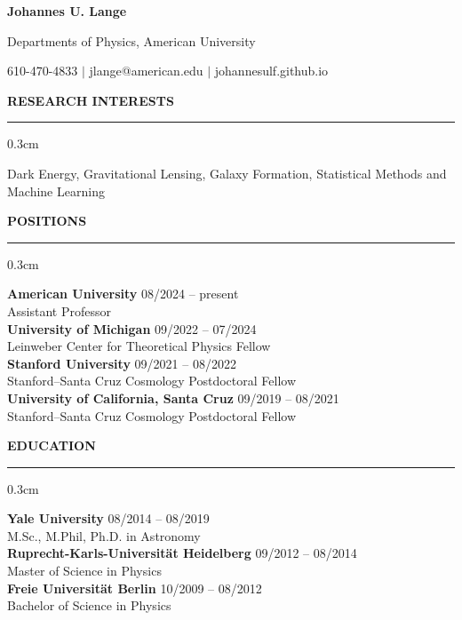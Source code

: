 \documentclass[12pt]{article}
\renewenvironment{section}[1]
  {
  \medskip
  {\color{aublue} \MakeUppercase{\bf #1}}
  \smallskip
  \hrule
  \medskip
  \begin{adjustwidth}{0.3cm}{}
  }
  {
  \end{adjustwidth}
  }
\newcommand{\entry}[3]{{\bf #1} \hfill {#2} \\ {#3}}
\begin{document}
\centerline{\color{aublue} \Huge \bf Johannes U. Lange}
\centerline{Departments of Physics, American University}
\centerline{610-470-4833 $\vert$ jlange@american.edu $\vert$ johannesulf.github.io}
\bigskip

\begin{section}{Research Interests}
  Dark Energy, Gravitational Lensing, Galaxy Formation, Statistical Methods and Machine Learning
\end{section}

\begin{section}{Positions}
  \entry{American University}{08/2024 -- present}{Assistant Professor} \medskip \\
  \entry{University of Michigan}{09/2022 -- 07/2024}{Leinweber Center for Theoretical Physics Fellow} \medskip \\
  \entry{Stanford University}{09/2021 -- 08/2022}{Stanford--Santa Cruz Cosmology Postdoctoral Fellow} \medskip \\
  \entry{University of California, Santa Cruz}{09/2019 -- 08/2021}{Stanford--Santa Cruz Cosmology Postdoctoral Fellow}
\end{section}

\begin{section}{Education}
  \entry{Yale University}{08/2014 -- 08/2019}{M.Sc., M.Phil, Ph.D. in Astronomy} \medskip \\
  \entry{Ruprecht-Karls-Universität Heidelberg}{09/2012 -- 08/2014}{Master of Science in Physics} \medskip \\
  \entry{Freie Universität Berlin}{10/2009 -- 08/2012}{Bachelor of Science in Physics}
\end{section}
\end{document}
